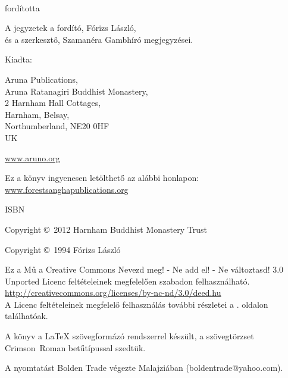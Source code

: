 {\small\setlength{\parskip}{0.8em}\setlength{\parindent}{0em}%
{\raggedright%

\thetitle\\
fordította \theauthor

A jegyzetek a fordító, Fórizs László,\\
és a szerkesztő, Szamanéra Gambhíró megjegyzései.

Kiadta:

Aruna Publications,\\
Aruna Ratanagiri Buddhist Monastery,\\
2 Harnham Hall Cottages,\\
Harnham, Belsay,\\
Northumberland, NE20 0HF\\
UK

\href{http://aruno.org}{www.aruno.org}

Ez a könyv ingyenesen letölthető az alábbi honlapon:\\
\href{http://forestsanghapublications.org/}{www.forestsanghapublications.org}

ISBN \theISBN

Copyright \copyright\ 2012 Harnham Buddhist Monastery Trust

Copyright \copyright\ 1994 Fórizs László


\vfill

{\footnotesize

Ez a Mű a Creative Commons Nevezd meg! - Ne add el! - Ne változtasd! 3.0 Unported Licenc feltételeinek megfelelően szabadon felhasználható.\\
\href{http://creativecommons.org/licenses/by-nc-nd/3.0/deed.hu}{http://creativecommons.org/licenses/by-nc-nd/3.0/deed.hu}\\

A Licenc feltételeinek megfelelő felhasználás további részletei a \pageref{copyright-details}. oldalon találhatóak.

A könyv a {\selectfont\LaTeX} szövegformázó rendszerrel készült, a szövegtörzset Crimson~Roman betűtípussal szedtük.

\theEditionInfo

A nyomtatást Bolden Trade végezte Malajziában (boldentrade@yahoo.com).

}

}}


